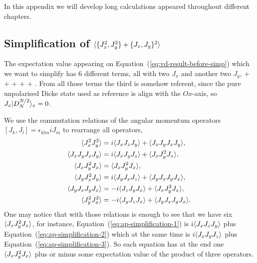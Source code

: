 In this appendix we will develop long calculations appeared throughout different chapters.

\subsection[Simplification of the Eq.~{(\ref{eq:vd-result-before-simp})}]
{Simplification of $\langle \{J_x^2,J_y^2\}+\{J_x,J_y\}^2 \rangle$}
\label{ap:loca-simplification}

The expectation value appearing on Equation~{(\ref{eq:vd-result-before-simp})} which we want to simplify has 6 different terms, all with two $J_x$ and another two $J_y$,
\be
   +  + 
  +  +  + .
\ee
From all those terms the third is somehow referent, since the pure unpolarised Dicke state used as reference is align with the $Ox$-axis, so $J_x\vert D_N^{N/2} \rangle_x=0$.

We use the commutation relations of the angular momentum operators $[J_k,J_l]=\epsilon_{klm} iJ_m$ to rearrange all operators,
\begin{subequations}
\begin{align}
  \langle J_x^2J_y^2 \rangle & = i\langle J_xJ_zJ_y \rangle+\langle J_xJ_yJ_xJ_y \rangle,
  \label{eq:ap-simplification-1} \\
  \langle J_xJ_yJ_xJ_y \rangle & = i\langle J_xJ_yJ_z \rangle+\langle J_xJ_y^2J_x \rangle,
  \label{eq:ap-simplification-2} \\
  \langle J_xJ_y^2J_x \rangle & = \langle J_xJ_y^2J_x \rangle,
  \label{eq:ap-simplification-3} \\
  \langle J_yJ_x^2J_y \rangle & = i\langle J_yJ_xJ_z \rangle + \langle J_yJ_xJ_yJ_x \rangle,
  \label{eq:ap-simplification-4} \\
  \langle J_yJ_xJ_yJ_x \rangle & = -i\langle J_zJ_yJ_x \rangle + \langle J_xJ_y^2J_x \rangle,
  \label{eq:ap-simplification-5} \\
  \langle J_y^2J_x^2 \rangle & = -i\langle J_yJ_zJ_x \rangle + \langle J_yJ_xJ_yJ_x \rangle.
  \label{eq:ap-simplification-6}
\end{align}
\end{subequations}
One may notice that with those relations is enough to see that we have six $\langle J_xJ_y^2J_x \rangle$, for instance, Equation~{(\ref{eq:ap-simplification-1})} is $i\langle J_xJ_zJ_y \rangle$ plus Equation~{(\ref{eq:ap-simplification-2})} which at the same time is $i\langle J_xJ_yJ_z \rangle$ plus Equation~{(\ref{eq:ap-simplification-3})}.
So each equation has at the end one $\langle J_xJ_y^2J_x \rangle$ plus or minus some expectation value of the product of three operators.


